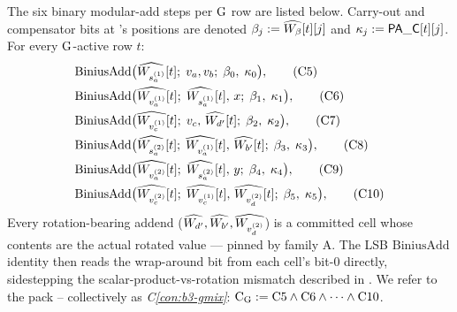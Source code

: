 The six binary modular-add steps per $\operatorname{G}$ row are listed below.
Carry-out and compensator bits at 's
positions are denoted $\beta_j := \widehat{W_\beta}[t][j]$ and
$\kappa_j := \mathsf{PA\_C}[t][j]$. For every $\operatorname{G}$-active row
$t$:
\begin{align}
\mathrm{BiniusAdd}\bigl(
    &\widehat{W_{s_a^{(1)}}}[t];\;
    v_a, v_b;\; \beta_0,\; \kappa_0\bigr), \tag{C5}\label{con:b3-mod-sa1}\\
\mathrm{BiniusAdd}\bigl(
    &\widehat{W_{v_a^{(1)}}}[t];\;
    \widehat{W_{s_a^{(1)}}}[t],\, x;\; \beta_1,\; \kappa_1\bigr), \tag{C6}\label{con:b3-mod-va1}\\
\mathrm{BiniusAdd}\bigl(
    &\widehat{W_{v_c^{(1)}}}[t];\;
    v_c,\, \widehat{W_{d'}}[t];\; \beta_2,\; \kappa_2\bigr), \tag{C7}\label{con:b3-mod-vc1}\\
\mathrm{BiniusAdd}\bigl(
    &\widehat{W_{s_a^{(2)}}}[t];\;
    \widehat{W_{v_a^{(1)}}}[t],\, \widehat{W_{b'}}[t];\; \beta_3,\; \kappa_3\bigr), \tag{C8}\label{con:b3-mod-sa2}\\
\mathrm{BiniusAdd}\bigl(
    &\widehat{W_{v_a^{(2)}}}[t];\;
    \widehat{W_{s_a^{(2)}}}[t],\, y;\; \beta_4,\; \kappa_4\bigr), \tag{C9}\label{con:b3-mod-va2}\\
\mathrm{BiniusAdd}\bigl(
    &\widehat{W_{v_c^{(2)}}}[t];\;
    \widehat{W_{v_c^{(1)}}}[t],\, \widehat{W_{v_d^{(2)}}}[t];\; \beta_5,\; \kappa_5\bigr), \tag{C10}\label{con:b3-mod-vc2}
\end{align}
Every rotation-bearing addend ($\widehat{W_{d'}}, \widehat{W_{b'}},
\widehat{W_{v_d^{(2)}}}$) is a committed cell whose contents are the actual
rotated value — pinned by family A. The LSB $\mathrm{BiniusAdd}$
identity then reads the wrap-around bit from each cell's bit-$0$
directly, sidestepping the scalar-product-vs-rotation mismatch
described in . We refer
to the pack -- collectively
as \emph{C\ref{con:b3-gmix}}: \label{con:b3-gmix}\(\text{C}_{\operatorname{G}}
:= \text{C5} \wedge \text{C6} \wedge \dots \wedge \text{C10}\).

